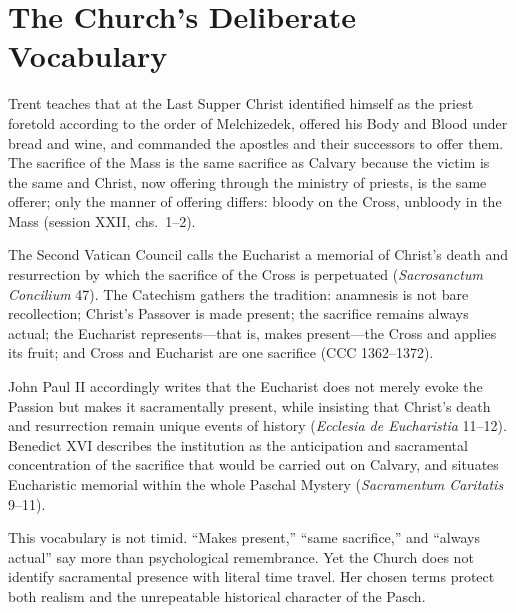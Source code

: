 \section{The Church's Deliberate Vocabulary}

Trent teaches that at the Last Supper Christ identified himself as the priest
foretold according to the order of Melchizedek, offered his Body and Blood
under bread and wine, and commanded the apostles and their successors to offer
them. The sacrifice of the Mass is the same sacrifice as Calvary because the
victim is the same and Christ, now offering through the ministry of priests,
is the same offerer; only the manner of offering differs: bloody on the Cross,
unbloody in the Mass (session XXII, chs.~1--2).

The Second Vatican Council calls the Eucharist a memorial of Christ's death and
resurrection by which the sacrifice of the Cross is perpetuated
(\emph{Sacrosanctum Concilium} 47). The Catechism gathers the tradition:
anamnesis is not bare recollection; Christ's Passover is made present; the
sacrifice remains always actual; the Eucharist represents---that is, makes
present---the Cross and applies its fruit; and Cross and Eucharist are one
sacrifice (CCC 1362--1372).

John Paul II accordingly writes that the Eucharist does not merely evoke the
Passion but makes it sacramentally present, while insisting that Christ's death
and resurrection remain unique events of history
(\emph{Ecclesia de Eucharistia} 11--12). Benedict XVI describes the institution
as the anticipation and sacramental concentration of the sacrifice that would
be carried out on Calvary, and situates Eucharistic memorial within the whole
Paschal Mystery (\emph{Sacramentum Caritatis} 9--11).

This vocabulary is not timid. ``Makes present,'' ``same sacrifice,'' and
``always actual'' say more than psychological remembrance. Yet the Church does
not identify sacramental presence with literal time travel. Her chosen terms
protect both realism and the unrepeatable historical character of the Pasch.

